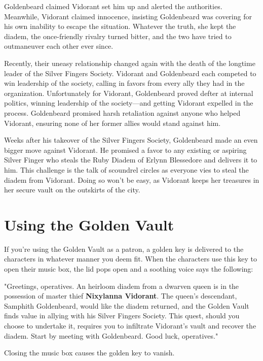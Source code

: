 \documentclass[10pt,a4paper,twoside,bg=print,twocolumn,openany,nodeprecatedcode]{dndbook}
\begin{document}
Goldenbeard claimed Vidorant set him up and alerted the authorities. Meanwhile, Vidorant claimed innocence, insisting Goldenbeard was covering for his own inability to escape the situation. Whatever the truth, she kept the diadem, the once-friendly rivalry turned bitter, and the two have tried to outmaneuver each other ever since.

Recently, their uneasy relationship changed again with the death of the longtime leader of the Silver Fingers Society. Vidorant and Goldenbeard each competed to win leadership of the society, calling in favors from every ally they had in the organization. Unfortunately for Vidorant, Goldenbeard proved defter at internal politics, winning leadership of the society—and getting Vidorant expelled in the process. Goldenbeard promised harsh retaliation against anyone who helped Vidorant, ensuring none of her former allies would stand against him.

Weeks after his takeover of the Silver Fingers Society, Goldenbeard made an even bigger move against Vidorant. He promised a favor to any existing or aspiring Silver Finger who steals the Ruby Diadem of Erlynn Blessedore and delivers it to him. This challenge is the talk of scoundrel circles as everyone vies to steal the diadem from Vidorant. Doing so won't be easy, as Vidorant keeps her treasures in her secure vault on the outskirts of the city.

\section{Using the Golden Vault}
If you're using the Golden Vault as a patron, a golden key is delivered to the characters in whatever manner you deem fit. When the characters use this key to open their music box, the lid pops open and a soothing voice says the following:

\begin{DndReadAloud}{}
"Greetings, operatives. An heirloom diadem from a dwarven queen is in the possession of master thief \textbf{Nixylanna Vidorant}. The queen's descendant, Samphith Goldenbeard, would like the diadem returned, and the Golden Vault finds value in allying with his Silver Fingers Society. This quest, should you choose to undertake it, requires you to infiltrate Vidorant's vault and recover the diadem. Start by meeting with Goldenbeard. Good luck, operatives."

\end{DndReadAloud}

Closing the music box causes the golden key to vanish.
\end{document}
